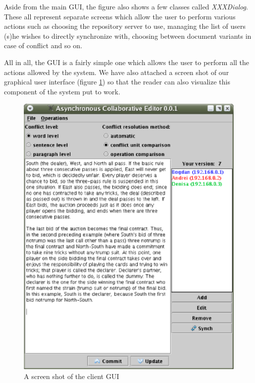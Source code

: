 Aside from the main GUI, the figure also shows a few classes called \emph{XXXDialog}. These
all represent separate screens which allow the user to perform various actions such as
choosing the repository server to use, managing the list of users (s)he wishes to
directly synchronize with, choosing between document variants in case of conflict and so
on.

All in all, the GUI is a fairly simple one which allows the user to perform all the actions
allowed by the system. We have also attached a screen shot of our graphical user interface
(figure \ref{fig:screenshot}) so that the reader can also visualize this component of
the system put to work.

\begin{figure}[htp]
\begin{center}
\includegraphics{img/screenshot.eps}
\end{center}
\caption{A screen shot of the client GUI}
\label{fig:screenshot}
\end{figure}

